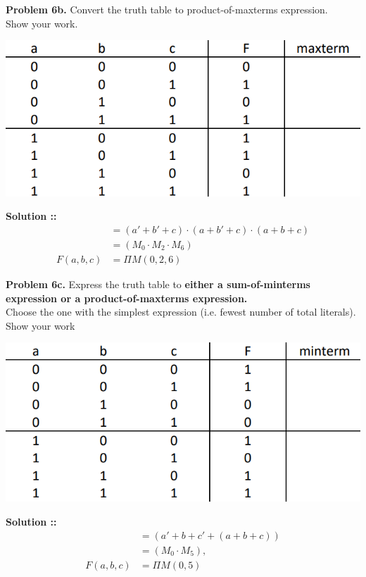 \documentclass[11pt]{article}
\begin{document}
\textbf{Problem 6b.} Convert the truth table to product-of-maxterms expression.\\
Show your work.
\begin{center}
    \includegraphics[scale=0.7]{6b.png}
\end{center}
\textbf{Solution ::}
\begin{align*}
    &= (a'+b'+c)\cdot(a+b'+c)\cdot(a+b+c) \\
    &= (M_0 \cdot M_2 \cdot M_6) \\
    F(a, b, c) &= \Pi M(0, 2, 6)
\end{align*}
\pagebreak

\textbf{Problem 6c.} Express the truth table to 
\textbf{either a sum-of-minterms expression or a product-of-maxterms expression.}
\\Choose the one with the simplest expression (i.e. fewest number of total literals). 
Show your work
\begin{center}
    \includegraphics[scale=0.7]{6a.png}
\end{center}
\textbf{Solution ::}
\begin{align*}
    &= (a'+b+c' + (a+b+c)) \\
    &= (M_0\cdot M_5), \\
    F(a, b, c) &= \Pi M(0, 5)
\end{align*}
\pagebreak
\end{document}
